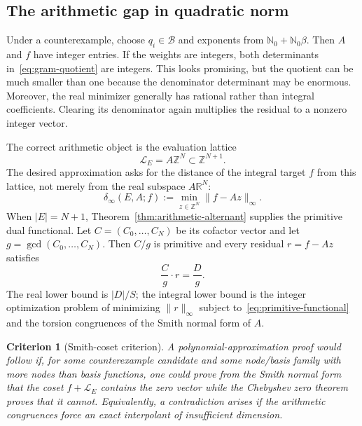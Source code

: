 \documentclass[11pt,oneside]{article}
\newtheorem{criterion}[theorem]{Criterion}
\theoremstyle{definition}
\theoremstyle{remark}
\newcommand{\Nzero}{\mathbb N_0}
\newcommand{\Z}{\mathbb Z}
\newcommand{\R}{\mathbb R}
\newcommand{\Bsem}{\mathcal B}
\newcommand{\cL}{\mathcal L}
\begin{document}
\subsection{The arithmetic gap in quadratic norm}

Under a counterexample, choose $q_i\in\Bsem$ and exponents from
$\Nzero+\Nzero\beta$.  Then $A$ and $f$ have integer entries.  If the weights are integers,
both determinants in~\eqref{eq:gram-quotient} are integers.  This looks promising, but the
quotient can be much smaller than one because the denominator determinant may be enormous.
Moreover, the real minimizer generally has rational rather than integral coefficients.
Clearing its denominator again multiplies the residual to a nonzero integer vector.

The correct arithmetic object is the evaluation lattice
\begin{equation}
 \cL_E=A\Z^N\subset\Z^{N+1}.
 \label{eq:evaluation-lattice}
\end{equation}
The desired approximation asks for the distance of the integral target $f$ from this lattice,
not merely from the real subspace $A\R^N$:
\begin{equation}
 \delta_\infty(E,A;f)
 :=\min_{z\in\Z^N}\|f-Az\|_\infty.
 \label{eq:evaluation-lattice-distance}
\end{equation}
When $|E|=N+1$, Theorem~\ref{thm:arithmetic-alternant} supplies the primitive dual
functional.  Let $C=(C_0,\ldots,C_N)$ be its cofactor vector and let
$g=\gcd(C_0,\ldots,C_N)$.  Then $C/g$ is primitive and every residual $r=f-Az$ satisfies
\begin{equation}
 \frac{C}{g}\cdot r=\frac{D}{g}.
 \label{eq:primitive-functional}
\end{equation}
The real lower bound is $|D|/S$; the integral lower bound is the integer optimization problem
of minimizing $\|r\|_\infty$ subject to~\eqref{eq:primitive-functional} and the torsion
congruences of the Smith normal form of $A$.

\begin{criterion}[Smith-coset criterion]
\label{crit:smith-coset}
A polynomial-approximation proof would follow if, for some counterexample candidate and some
node/basis family with more nodes than basis functions, one could prove from the Smith normal
form that the coset $f+\cL_E$ contains the zero vector while the Chebyshev zero theorem proves
that it cannot.  Equivalently, a contradiction arises if the arithmetic congruences force an
exact interpolant of insufficient dimension.
\end{criterion}
\end{document}
